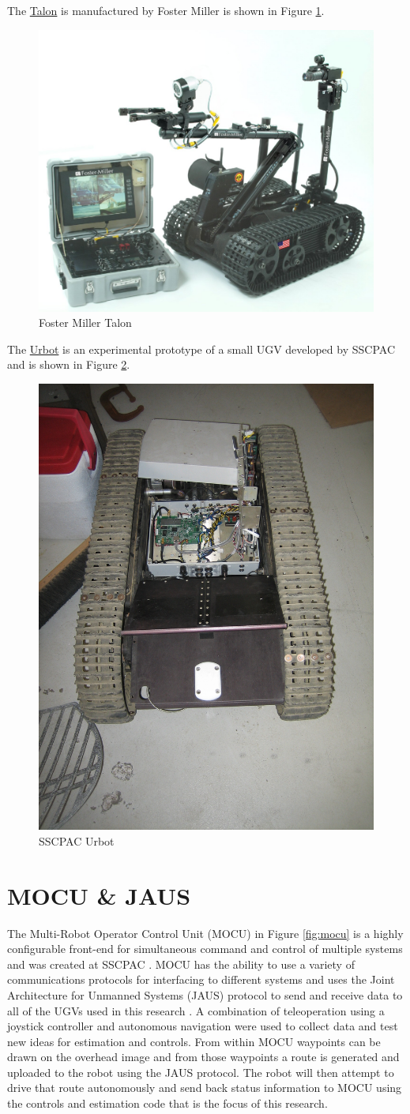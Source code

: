 The \href{http://www.foster-miller.com/lemming.htm}{Talon} is manufactured by Foster Miller is shown in Figure \ref{fig:talon}.

\begin{figure}[ht!]
	\centering
	\includegraphics[width=.3\textwidth]{images/talon}
	\caption{Foster Miller Talon}
	\label{fig:talon}
\end{figure}

The \href{http://www.spawar.navy.mil/robots/land/mprs/mprs.html}{Urbot} is an experimental prototype of a small UGV developed by SSCPAC and is shown in Figure \ref{fig:urbot}.

\begin{figure}[ht!]
	\centering
	\includegraphics[width=.3\textwidth]{images/urbot}
	\caption{SSCPAC Urbot}
	\label{fig:urbot}
\end{figure}

\section{MOCU \& JAUS}
\label{sec:mocujaus}
The Multi-Robot Operator Control Unit (MOCU) in Figure \ref{fig:mocu} is a highly configurable front-end for simultaneous command and control of multiple systems and was created at SSCPAC \cite{PowellMOCU08}. MOCU has the ability to use a variety of communications protocols for interfacing to different systems and uses the Joint Architecture for Unmanned Systems (JAUS) protocol to send and receive data to all of the UGVs used in this research \cite{RoweJAUS08}. A combination of teleoperation using a joystick controller and autonomous navigation were used to collect data and test new ideas for estimation and controls. From within MOCU waypoints can be drawn on the overhead image and from those waypoints a route is generated and uploaded to the robot using the JAUS protocol. The robot will then attempt to drive that route autonomously and send back status information to MOCU using the controls and estimation code that is the focus of this research.

